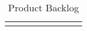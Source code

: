 \begin{landscape}
\begin{adjustwidth}{-1cm}{}
\begin{longtable}{|c|p{3cm}|p{8cm}|c|c|p{2cm}|p{2cm}|c|}

    \hline
        \caption{Product Backlog}
        
      \end{longtable}
    \end{adjustwidth}
\end{landscape}